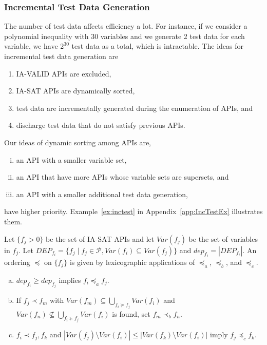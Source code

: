 \documentclass[runningheads,a4paper,oribibl]{llncs}
\begin{document}
\subsubsection{Incremental Test Data Generation} \label{sec:incremental}

The number of test data affects efficiency a lot. 
For instance, if we consider a polynomial inequality with 30 variables and we generate 
2 test data for each variable, 
we have $2^{30}$ test data as a total, which is intractable. 
The ideas for incremental test data generation are 
\begin{enumerate}
\item IA-VALID APIs are excluded, 
\item IA-SAT APIs are dynamically sorted, 
\item test data are incrementally generated during the enumeration of APIs, and 
\item discharge test data that do not satisfy previous APIs. 
\end{enumerate} 

Our ideas of dynamic sorting among APIs are, 
\begin{enumerate}[(i)]
\item an API with a smaller variable set, 
\item an API that have more APIs whose variable sets are supersets, and 
\item an API with a smaller additional test data generation, 
\end{enumerate} 
have higher priority. Example~\ref{ex:inctest} in Appendix~\ref{app:IncTestEx} illustrates them. 

Let $\{ f_j > 0 \}$ be the set of IA-SAT APIs and 
let $Var(f_j)$ be the set of variables in $f_j$. 
Let 
$DEP_{f_i}=\{f_j \mid f_j \in {\mathcal P}, Var(f_i) \subseteq Var(f_j)\}$ and $dep_{f_i} = |DEP_{f_i}|$. 
An ordering $\preceq$ on $\{ f_j \}$ is given by lexicographic applications of 
$\preceq_{a}$, $\preceq_{b}$, and $\preceq_{c}$. 
\begin{enumerate}[(a)]
\item $dep_{f_i} \geq dep_{f_j}$ implies $f_i \preceq_{a} f_j$. 
\item If $f_j \prec f_m$ with 
$Var(f_m) \subseteq \bigcup \limits_{f_i \succeq f_j} Var(f_i)$ and 
$Var(f_n) \nsubseteq \bigcup \limits_{f_i \succeq f_j} Var(f_i)$ is found, set $f_m \prec_{b} f_n$. 
\item $f_i \prec f_j, f_k$ and $|Var(f_j) \setminus Var(f_i)| \leq |Var(f_k) \setminus Var(f_i)|$
imply $f_j \preceq_{c} f_k$. 
\end{enumerate}
\end{document}
